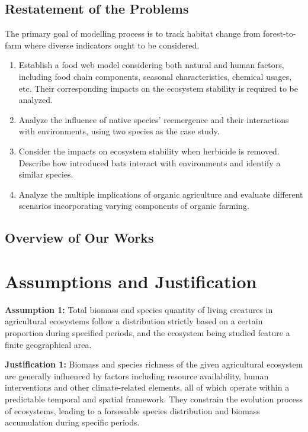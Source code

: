 \documentclass[12pt]{article}
\begin{document}
	\subsection{Restatement of the Problems}
	\hspace{1.5em}The primary goal of modelling process is to track habitat change from forest-to-farm where diverse indicators ought to be considered.
	\begin{enumerate}
		\item Establish a food web model considering both natural and human factors, including food chain components, seasonal characteristics, chemical usages, etc. Their corresponding impacts on the ecosystem stability is required to be analyzed.
		\item Analyze the influence of native species' reemergence and their interactions with environments,  using two species as the case study.
		\item Consider the impacts on ecosystem stability when herbicide is removed. Describe how introduced bats interact with environments and identify a similar species.
		\item Analyze the multiple implications of organic agriculture and evaluate different scenarios incorporating varying components of organic farming.
	\end{enumerate}
	
	\subsection{Overview of Our Works}
	
	
	
	
	
	
	
	
	
	
	
	
	
	
	\section{Assumptions and Justification}
	\hspace{1.5em}\textbf{Assumption 1: }Total biomass and species quantity of living creatures in agricultural ecosystems follow a distribution strictly based on a certain proportion during specified periods, and the ecosystem being studied feature a finite geographical area.
	
	\textbf{Justification 1: }Biomass and species richness of the given agricultural ecosystem are generally  influenced by factors including resource availability, human interventions and other climate-related elements, all of which operate within a predictable temporal and spatial framework. They constrain the evolution process of ecosystems, leading to a forseeable species distribution and biomass accumulation during specific periods. 
	
\end{document}
